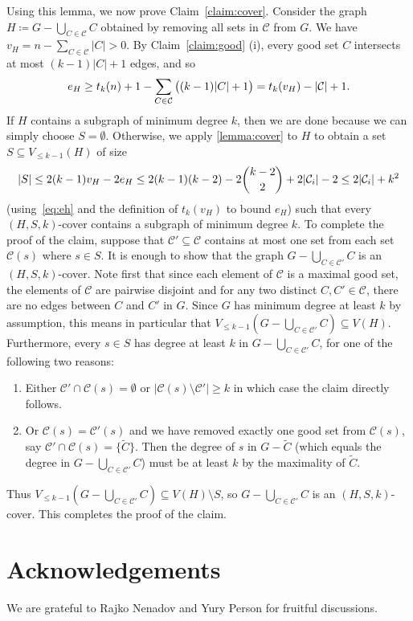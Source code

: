 \documentclass[11pt]{article}
\numberwithin{theorem}{section}
\DeclarePairedDelimiter\abs{\lvert}{\rvert}
\begin{document}
Using this lemma, we now prove Claim~\ref{claim:cover}.
Consider the graph $H\coloneqq G-\bigcup_{C\in\mathcal C} C$ obtained
by removing all sets in $\mathcal C$ from $G$.
We have $v_H = n - \sum_{C\in \mathcal C} |C|>0$. By Claim~\ref{claim:good} (i),
every good set $C$ intersects at most $(k-1)|C|+1$ edges, and so
\begin{equation}\label{eq:eh}
  e_H \geq t_k(n)+1-\sum_{C\in\mathcal C}\big((k-1)\abs C + 1\big) =
  t_k(v_H)-\abs{\mathcal C} + 1.
\end{equation}
If $H$ contains a subgraph of minimum degree $k$, then we are done because
we can simply choose $S=\emptyset$. Otherwise, we apply \autoref{lemma:cover}
to $H$ to obtain a set $S \subseteq V_{\leq k-1}(H)$ of size
\[
  |S|\leq 2(k-1)v_H-2e_H \leq 2(k-1)(k-2) - 2\binom{k-2}{2} + 2\abs{\mathcal
  C_i} -2 \leq 2\abs{\mathcal C_i} + k^2
  \]
(using~\eqref{eq:eh} and the definition of $t_k(v_H)$ to bound $e_H$)
such that every $(H,S,k)$-cover contains a subgraph of minimum degree $k$.
To complete the proof of the claim, suppose that
$\mathcal C'\subseteq \mathcal C$ contains at most one set from each
set $\mathcal C(s)$ where $s\in S$. It is enough to show that the graph 
$G - \bigcup_{C\in \mathcal C'} C$ is an $(H,S,k)$-cover.
Note first that since each element of $\mathcal C$ is a
maximal good set, the elements of $\mathcal C$ are pairwise disjoint and for
any two distinct $C,C'\in \mathcal C$, there are no edges between $C$ and
$C'$ in $G$. 
Since $G$ has minimum degree at least $k$ by assumption,
this means in particular that 
$V_{\leq k-1}(G-\bigcup_{C\in\mathcal C'} C) \subseteq V(H)$.
Furthermore, every $s\in S$ has degree at least $k$ in $G -
\bigcup_{C\in \mathcal C'} C$, for one of the following two reasons:
\begin{enumerate}
\item Either $\mathcal C' \cap \mathcal C(s) = \emptyset$ or $|\mathcal C(s)
  \setminus \mathcal C'| \ge k$ in which case the claim directly follows.
\item Or $\mathcal C(s) =\mathcal C'(s)$ and
  we have removed exactly one good set from $\mathcal C(s)$, say
  $\mathcal C' \cap \mathcal C(s)=\{\tilde C\}$. Then the degree of $s$ in $G
    - \tilde C$ (which equals the degree in $G -
    \bigcup_{C\in \mathcal C'} C$)
    must be at least $k$ by the maximality of $\tilde C$.
\end{enumerate}
Thus $V_{\leq k-1}(G-\bigcup_{C\in\mathcal C'} C) \subseteq V(H)\setminus S$,
so $G - \bigcup_{C\in \mathcal C'} C$ is an $(H,S,k)$-cover. This
completes the proof of the claim.

\section{Acknowledgements}

We are grateful to Rajko Nenadov and Yury Person for fruitful discussions.



\end{document}
